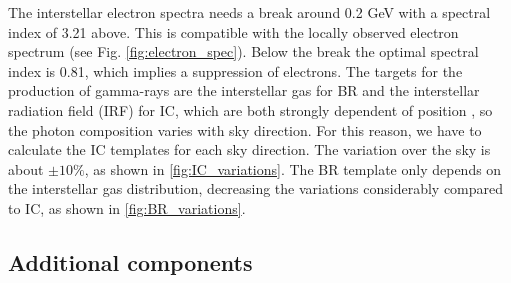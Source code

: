 The interstellar electron spectra needs a break around 0.2 GeV with a spectral index of 3.21 above. This is compatible with the locally observed electron spectrum (see Fig. \ref{fig:electron_spec}). Below the break the optimal spectral index is 0.81, which implies a suppression of electrons. %
The targets for the production of gamma-rays are the interstellar gas for BR and the interstellar radiation field (IRF) for IC, which are both strongly dependent of position%
, so the photon composition varies with sky direction.
For this reason, we have to calculate the IC templates for each sky direction. The variation over the sky is about $\pm 10\%$, as shown in \ref{fig:IC_variations}. 
The BR template only depends on the interstellar gas distribution, decreasing the variations considerably compared to IC, as shown in \ref{fig:BR_variations}.







\subsection{Additional components}

